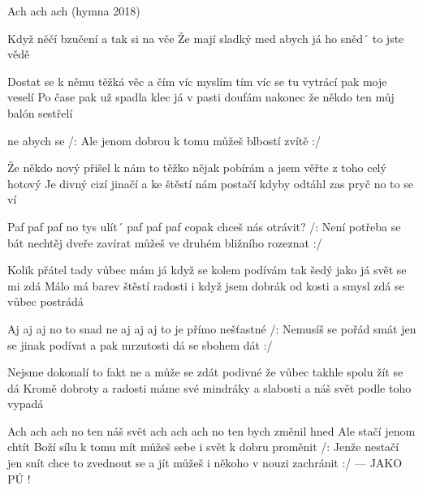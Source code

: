 \begin{TEXT}{Ach ach ach (hymna 2018)}

\SLOKA Když  něčí bzučení a \NL
tak  si  na vče\NL
Že  mají sladký med  abych já ho sněd´\NL
to   jste vědě\NL

Dostat se k němu těžká věc a čím víc myslím tím víc se\NL
tu vytrácí pak moje veselí\NL
Po čase pak už spadla klec já v pasti doufám nakonec\NL
že někdo ten můj balón sestřelí

\REFREN

 \NL
{} ne abych se \NL
/: Ale  jenom  dobrou  k tomu \NL
můžeš  blbostí  zvítě :/

\SLOKA Že někdo nový přišel k nám to těžko nějak pobírám\NL
a jsem věřte z toho celý hotový\NL
Je divný cizí jinačí a ke štěstí nám postačí\NL
kdyby odtáhl zas pryč no to se ví

\REFREN Paf paf paf no tys ulít´\NL
         paf paf paf copak chceš nás otrávit?\NL
/: Není potřeba se bát\NL
 nechtěj dveře zavírat\NL
můžeš ve druhém bližního rozeznat :/

\SLOKA Kolik přátel tady vůbec mám já když se kolem podívám\NL
tak šedý jako já svět se mi zdá\NL
Málo má barev štěstí radosti i když jsem dobrák od kosti\NL
a smysl zdá se vůbec postrádá

\REFREN Aj aj aj no to snad ne\NL
aj aj aj to je přímo nešťastné\NL
/: Nemusíš se pořád smát\NL
jen se jinak podívat\NL
a pak mrzutosti dá se sbohem dát :/

\SLOKA Nejsme dokonalí to fakt ne a může se zdát podivné\NL
že vůbec takhle spolu žít se dá\NL
Kromě dobroty a radosti máme své mindráky a slabosti\NL
a náš svět podle toho vypadá

\REFREN Ach ach ach no ten náš svět\NL
ach ach ach no ten bych změnil hned\NL
Ale stačí jenom chtít\NL
Boží sílu k tomu mít\NL
můžeš sebe i svět k dobru proměnit\NL
/: Jenže nestačí jen snít\NL
chce to zvednout se a jít\NL
můžeš i někoho v nouzi zachránit :/\NL
\hspace*{2cm}--- JAKO PÚ !
\end{TEXT}